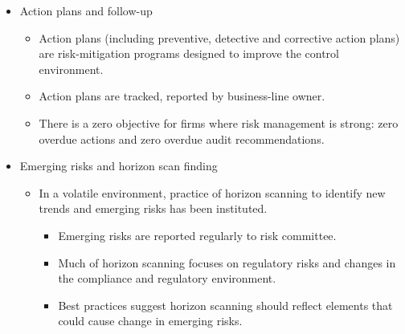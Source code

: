 \begin{itemize}
\begin{itemize}
\begin{itemize}
        \item Although increasingly standardized, reporting thresholds may vary widely from firm to firm.
        \end{itemize}
    \item The materiality of an operational risk event must be judged not only by actual impact but also by potential impact.
        \begin{itemize}
        \item Reporting thresholds for risk events and near misses should theoretically be based on potential impact of the event rather than its materialized impact.
        \item Given the difficulty to estimate potential impact, firms and regulators use observed impact to set reporting thresholds.
        
        \end{itemize}
    \end{itemize}
\item Action plans and follow-up
    \begin{itemize}
    \item Action plans (including preventive, detective and corrective action plans) are risk-mitigation programs designed to improve the control environment.
    \item Action plans are tracked, reported by business-line owner.
    \item There is a zero objective for firms where risk management is strong: zero overdue actions and zero overdue audit recommendations.
    \end{itemize}
\item Emerging risks and horizon scan finding
    \begin{itemize}
    \item In a volatile environment, practice of horizon scanning to identify new trends and emerging risks has been instituted.
        \begin{itemize}
        \item Emerging risks are reported regularly to risk committee.
        \item Much of horizon scanning focuses on regulatory risks and changes in the compliance and regulatory environment.
        \item Best practices suggest horizon scanning should reflect elements that could cause change in emerging risks.
        \end{itemize}
        
    \end{itemize}



\end{itemize}



